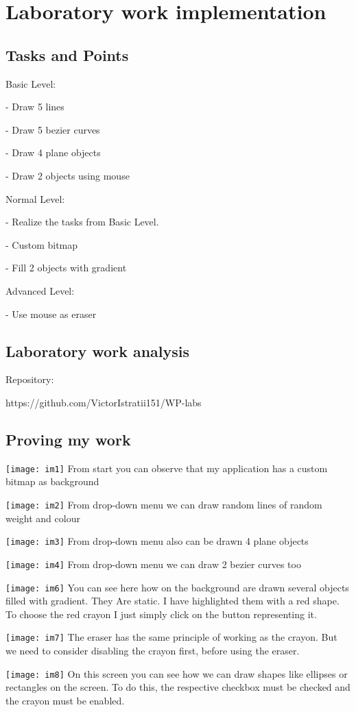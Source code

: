 \section{Laboratory work implementation}

\subsection{Tasks and Points}

Basic Level:

    - Draw 5 lines
    
    - Draw 5 bezier curves
   
    - Draw 4 plane objects
    
    - Draw 2 objects using mouse


Normal Level:

    - Realize the tasks from Basic Level.

    - Custom bitmap
    
    - Fill 2 objects with gradient


Advanced Level:

	- Use mouse as eraser

\subsection{Laboratory work analysis}

Repository:

https://github.com/VictorIstratii151/WP-labs

\subsection{Proving my work}

\texttt{[image: im1]}
From start you can observe that my application has a custom bitmap as background



\texttt{[image: im2]}
From drop-down menu we can draw  random lines of random weight and colour



\texttt{[image: im3]}
From drop-down menu also can be drawn 4 plane objects

\texttt{[image: im4]}
From drop-down menu we can draw 2 bezier curves too


\texttt{[image: im6]}
You can see here how on the background are drawn several objects filled with gradient. They Are static. I have highlighted them with a red shape. To choose the red crayon I just simply click on the  button representing it. 



\texttt{[image: im7]}
The eraser has the same principle of working as the crayon. But we need to consider disabling the crayon first, before using the eraser.

\texttt{[image: im8]}
On this screen you can see how we can draw shapes like ellipses or rectangles on the screen. To do this, the respective checkbox must be checked and the crayon must be enabled.


\clearpage
